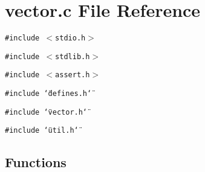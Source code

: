 \section{vector.c File Reference}
\label{vector_8c}
{\tt \#include $<$stdio.h$>$}\par
{\tt \#include $<$stdlib.h$>$}\par
{\tt \#include $<$assert.h$>$}\par
{\tt \#include \char`\"{}defines.h\char`\"{}}\par
{\tt \#include \char`\"{}vector.h\char`\"{}}\par
{\tt \#include \char`\"{}util.h\char`\"{}}\par
\subsection*{Functions}
